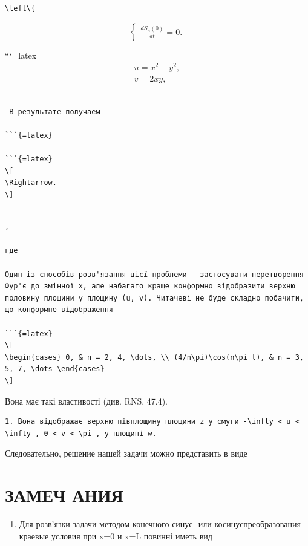 \documentclass[
]{article}
\providecommand{\tightlist}{%
  \setlength{\itemsep}{0pt}\setlength{\parskip}{0pt}}
\begin{document}
\begin{verbatim}
\left\{
\end{verbatim}

\[
\begin{cases} \frac{dS_n(0)}{dt} = 0. \end{cases}
\]

```{=latex}
\[
\begin{aligned} u=x^2-y^2,\\ v=2xy, \end{aligned}
\]

\begin{verbatim}

 В результате получаем

```{=latex}

```{=latex}
\[
\Rightarrow.
\]
\end{verbatim}

\begin{verbatim}

,

где

Один із способів розв'язання цієї проблеми — застосувати перетворення Фур'є до змінної x, але набагато краще конформно відобразити верхню половину площини у площину (u, v). Читачеві не буде складно побачити, що конформне відображення

```{=latex}
\[
\begin{cases} 0, & n = 2, 4, \dots, \\ (4/n\pi)\cos(n\pi t), & n = 3, 5, 7, \dots \end{cases}
\]
\end{verbatim}

Вона має такі властивості (див. RNS. 47.4).

\begin{verbatim}
1. Вона відображає верхню півплощину площини z у смуги -\infty < u < \infty , 0 < v < \pi , у площині w.
\end{verbatim}

Следовательно, решение нашей задачи можно представить в виде

\section{ЗАМЕЧ
АНИЯ}\label{ux437ux430ux43cux435ux447-ux430ux43dux438ux44f}

\begin{enumerate}
\def\labelenumi{\arabic{enumi}.}
\tightlist
\item
  Для розв'язки задачи методом конечного синус- или
  косинуспреобразования краевые условия при x=0 и x=L повинні иметь вид
\end{enumerate}
\end{document}
